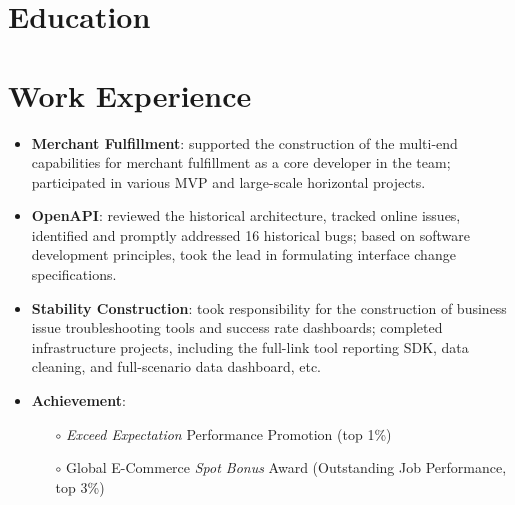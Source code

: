 \documentclass{resume}
\begin{document}



\section{Education}


\section{Work Experience}
\begin{itemize}[parsep=0.2ex]
    \item \textbf{Merchant Fulfillment}: supported the construction of the multi-end capabilities for merchant fulfillment 
    as a core developer in the team; participated in various MVP and large-scale horizontal projects.
    \item \textbf{OpenAPI}: reviewed the historical architecture, tracked online issues, identified and promptly addressed 
    16 historical bugs; based on software development principles, took the lead in formulating interface change specifications.
    \item \textbf{Stability Construction}: took responsibility for the construction of business issue troubleshooting tools and 
    success rate dashboards; completed infrastructure projects, including the full-link tool reporting SDK, data cleaning, and 
    full-scenario data dashboard, etc.
    \item \textbf{Achievement}: 
      \begin{itemize}
          \item[$\circ$] \textit{Exceed Expectation} Performance Promotion (top 1\%)
          \item[$\circ$] Global E-Commerce \textit{Spot Bonus} Award (Outstanding Job Performance, top 3\%)
      \end{itemize}
\end{itemize}
\end{document}
